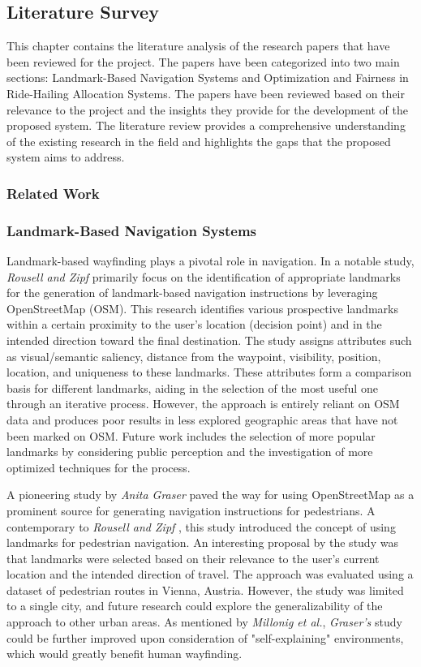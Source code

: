 \subsection{Literature Survey}
This chapter contains the literature analysis of the research papers that have been reviewed for the project. The papers have been categorized into two main sections: Landmark-Based Navigation Systems and Optimization and Fairness in Ride-Hailing Allocation Systems. The papers have been reviewed based on their relevance to the project and the insights they provide for the development of the proposed system. The literature review provides a comprehensive understanding of the existing research in the field and highlights the gaps that the proposed system aims to address.
\subsubsection{Related Work}
\subsubsection*{Landmark-Based Navigation Systems}

Landmark-based wayfinding plays a pivotal role in navigation. In a notable study, \textit{Rousell and Zipf} \cite{rousell-2017} primarily focus on the identification of appropriate landmarks for the generation of landmark-based navigation instructions by leveraging OpenStreetMap (OSM). This research identifies various prospective landmarks within a certain proximity to the user’s location (decision point) and in the intended direction toward the final destination. The study assigns attributes such as visual/semantic saliency, distance from the waypoint, visibility, position, location, and uniqueness to these landmarks. These attributes form a comparison basis for different landmarks, aiding in the selection of the most useful one through an iterative process. However, the approach is entirely reliant on OSM data and produces poor results in less explored geographic areas that have not been marked on OSM. Future work includes the selection of more popular landmarks by considering public perception and the investigation of more optimized techniques for the process.

A pioneering study by \textit{Anita Graser} \cite{graser-2017} paved the way for using OpenStreetMap as a prominent source for generating navigation instructions for pedestrians. A contemporary to \textit{Rousell and Zipf} \cite{rousell-2017}, this study introduced the concept of using landmarks for pedestrian navigation. An interesting proposal by the study was that landmarks were selected based on their relevance to the user's current location and the intended direction of travel. The approach was evaluated using a dataset of pedestrian routes in Vienna, Austria. However, the study was limited to a single city, and future research could explore the generalizability of the approach to other urban areas. As mentioned by \textit{Millonig et al.}, \textit{Graser's} study could be further improved upon consideration of "self-explaining" \cite{millonig-2021} environments, which would greatly benefit human wayfinding.

